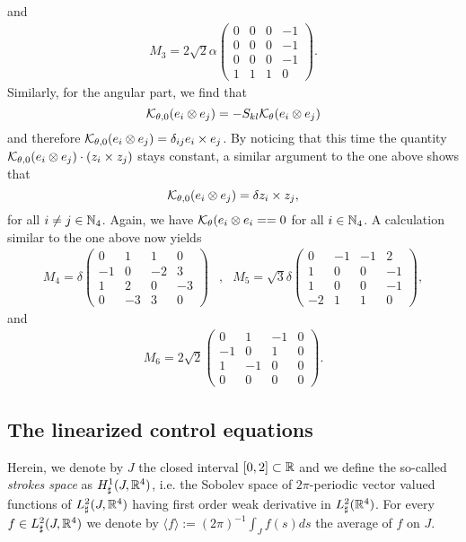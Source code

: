 and
\begin{align}
\label{eq: M3}
M_3 = 2 \sqrt{2} \alpha \left (
\begin{array}{cccc}
0 & 0 & 0 & -1 \\ 
0 & 0 & 0 & -1 \\ 
0 & 0 & 0 & -1 \\ 
1 & 1 & 1 & 0
\end{array} 
\right ).
\end{align}
Similarly, for the angular part, we find that
\begin{equation}
	\mathcal{K}_{\theta, 0}(e_i \otimes e_j) = - S_{kl} \mathcal{K}_{\theta}(e_i \otimes e_j)
\end{equation}
and therefore $\mathcal{K}_{\theta,0}(e_i \otimes e_j) = \delta_{ij} e_i \times e_j$. By noticing that this time the quantity $\mathcal{K}_{\theta,0}(e_i \otimes e_j) \cdot (z_i \times z_j)$ stays constant, a similar argument to the one above shows that
\begin{equation}
\mathcal{K}_{\theta,0}(e_i \otimes e_j) = \delta z_i \times z_j,
\end{equation}
for all $i \neq j \in \mathbb{N}_4$. Again, we have $\mathcal{K}_{\theta}(e_i \otimes e_i= = 0$ for all $i \in \mathbb{N}_4$. A calculation similar to the one above now yields
\begin{align}
\label{eq: M4 and M5}
	M_4 = \delta \left (
	\begin{array}{cccc}
	0 & 1 & 1 & 0 \\ 
	-1 & 0 & -2 & 3 \\ 
	1 & 2 & 0 & -3 \\ 
	0 & -3 & 3 & 0
	\end{array} 
	\right ) &, & M_5 = \sqrt{3} \delta \left ( \begin{array}{cccc}
	0 & -1 & -1 & 2 \\ 
	1 & 0 & 0 & -1 \\ 
	1 & 0 & 0 & -1 \\ 
	-2 & 1 & 1 & 0
	\end{array} \right ) ,
\end{align}
and
\begin{align}
\label{eq: M6}
M_6 = 2 \sqrt{2} \left (\begin{array}{cccc}
0 & 1 & -1 & 0 \\ 
-1 & 0 & 1 & 0 \\ 
1 & -1 & 0 & 0 \\ 
0 & 0 & 0 & 0
\end{array}  \right ).
\end{align}

\subsection{The linearized control equations}
Herein, we denote by $J$ the closed interval  $[0,2] \subset \mathbb{R}$ and we define the so-called \emph{strokes space} as $H_\sharp^1(J, \mathbb{R}^4)$, i.e. the Sobolev space of $2\pi$-periodic vector valued functions of $L_{\sharp}^2(J, \mathbb{R}^4)$ having first order weak derivative in $L_{\sharp}^2(\mathbb{R}^4)$. For every $f \in L^{2}_{\sharp}(J, \mathbb{R}^4)$ we denote by $\langle f \rangle := (2\pi)^{-1} \int_{J} f(s) ds$ the average of $f$ on $J$.

